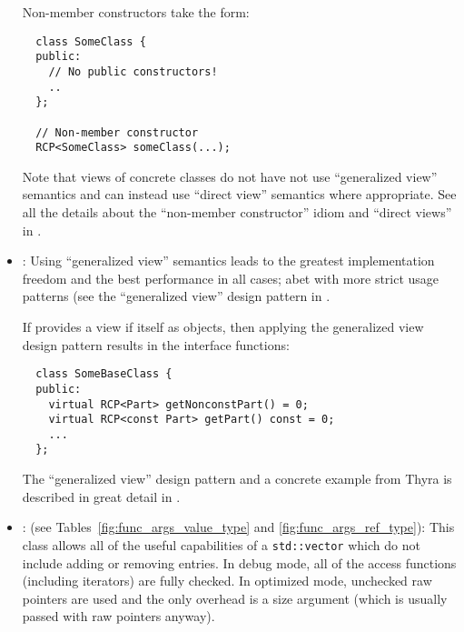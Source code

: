 \begin{itemize}
Non-member constructors take the form:

{\small\begin{verbatim}
  class SomeClass {
  public:
    // No public constructors!
    ..
  };

  // Non-member constructor
  RCP<SomeClass> someClass(...);
\end{verbatim}}

Note that views of concrete classes do not have not use ``generalized
view'' semantics and can instead use ``direct view'' semantics where
appropriate.  See all the details about the ``non-member constructor''
idiom and ``direct views'' in {}\cite{TeuchosMemoryManagementGuide}.


{}\item\GCGGeneralizedViews: Using ``generalized view'' semantics
leads to the greatest implementation freedom and the best performance
in all cases; abet with more strict usage patterns (see the
``generalized view'' design pattern in
{}\cite{TeuchosMemoryManagementGuide}.

If {} provides a view if itself as {}
objects, then applying the generalized view design pattern results in
the interface functions:

{\small\begin{verbatim}
  class SomeBaseClass {
  public:
    virtual RCP<Part> getNonconstPart() = 0;
    virtual RCP<const Part> getPart() const = 0;
    ...
  };
\end{verbatim}}

The ``generalized view'' design pattern and a concrete example from
Thyra is described in great detail in
{}\cite{TeuchosMemoryManagementGuide}.


{}\item\GCGTeuchosArrayView: (see Tables~\ref{fig:func_args_value_type} and
{}\ref{fig:func_args_ref_type}): This class allows all of the useful
capabilities of a {}\texttt{std::vector} which do not include adding or
removing entries.  In debug mode, all of the access functions (including
iterators) are fully checked.  In optimized mode, unchecked raw pointers are
used and the only overhead is a size argument (which is usually passed with
raw pointers anyway).



\end{itemize}
